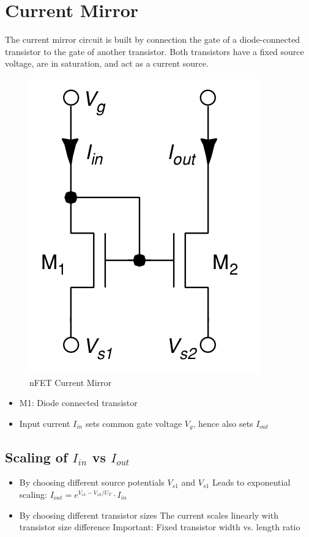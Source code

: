 \documentclass[main]{subfiles}
\begin{document}

\section{Current Mirror}
The current mirror circuit is built by connection the gate of a diode-connected transistor to the gate of another transistor.
Both transistors have a fixed source voltage, are in saturation, and act as a current source.


\begin{figure}[htbp]
  \centering
  \includegraphics[scale=1]{figs/current_mirror_vlsi.png}
  \caption{nFET Current Mirror \cite{book:VLSI}}
  \label{fig:nFET_Current_Mirror}
\end{figure}\bigskip

\begin{itemize}
\item M1: Diode connected transistor
\item Input current $I_{in}$ sets common gate voltage $V_g$, hence also sets $I_{out}$
\end{itemize}

\subsection{Scaling of $I_{in}$ vs $I_{out}$}
\begin{itemize}
\item By choosing different source potentials $V_{s1}$ and $V_{s1}$
\subitem Leads to exponential scaling: $I_{out}=e^{V_{s1}-V_{s2}/U_T} \cdot I_{in}$
\item By choosing different transistor sizes
\subitem The current scales linearly with transistor size difference 
\subitem Important: Fixed transistor width vs. length ratio
\end{itemize}
\end{document}
